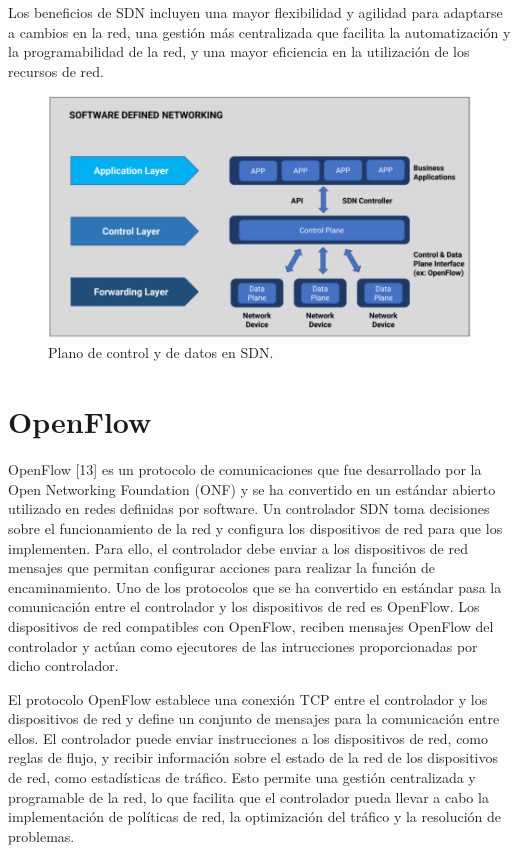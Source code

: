 \documentclass[a4paper, 12pt]{book}
\begin{document}
	Los beneficios de SDN incluyen una mayor flexibilidad y agilidad para adaptarse a cambios en la red, una gestión más centralizada que facilita la automatización y la programabilidad de la red, y una mayor eficiencia en la utilización de los recursos de red.
	
	
	\begin{figure}[H]
		\centering
		\includegraphics[width=14cm, keepaspectratio]{img/SDN}
		\caption{Plano de control y de datos en SDN.}
		\label{figura:SDN}
	\end{figure}
	
	\section{OpenFlow}
	\label{sec:openflow}
	
	
	OpenFlow [13] es un protocolo de comunicaciones que fue desarrollado por la Open Networking Foundation (ONF) y se ha convertido en un estándar abierto utilizado en redes definidas por software.
	Un controlador SDN toma decisiones sobre el funcionamiento de la red y configura los dispositivos de red para que los implementen. Para ello, el controlador debe enviar a los dispositivos de red mensajes que permitan configurar acciones para realizar la función de encaminamiento. Uno de los protocolos que se ha convertido en estándar pasa la comunicación entre el controlador y los dispositivos de red es OpenFlow. Los dispositivos de red compatibles con OpenFlow, reciben mensajes  OpenFlow del controlador y actúan como ejecutores de las intrucciones proporcionadas por dicho controlador.
	
	El protocolo OpenFlow establece una conexión TCP entre el controlador y los dispositivos de red  y define un conjunto de mensajes para la comunicación entre ellos. El controlador puede enviar instrucciones a los dispositivos de red, como reglas de flujo, y recibir información sobre el estado de la red de los dispositivos de red, como estadísticas de tráfico. Esto permite una gestión centralizada y programable de la red, lo que facilita que el controlador pueda llevar a cabo la implementación de políticas de red, la optimización del tráfico y la resolución de problemas.
\end{document}
